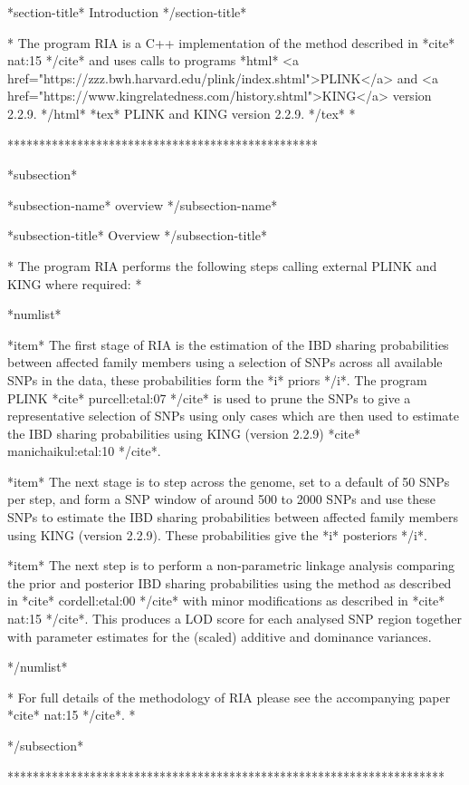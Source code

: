 *section-title* Introduction */section-title*

*
The program RIA is a C++ implementation of the method described in *cite* nat:15 */cite* and uses calls to programs *html* <a href="https://zzz.bwh.harvard.edu/plink/index.shtml">PLINK</a> and <a href="https://www.kingrelatedness.com/history.shtml">KING</a> version 2.2.9. */html* *tex* PLINK and KING version 2.2.9. */tex*
*

*************************************************


*subsection*

*subsection-name*
overview
*/subsection-name*

*subsection-title*
Overview
*/subsection-title*

*
The program RIA performs the following steps calling external PLINK and KING where required:
*

*numlist*

*item*
The first stage of RIA is the estimation of the IBD sharing probabilities between affected family members using a selection of SNPs across all available SNPs in the data, these probabilities form the *i* priors */i*. The program PLINK *cite* purcell:etal:07 */cite* is used to prune the SNPs to give a representative selection of SNPs using only cases which are then used to estimate the IBD sharing probabilities using KING (version 2.2.9) *cite* manichaikul:etal:10 */cite*.


*item*
The next stage is to step across the genome, set to a default of 50 SNPs per step, and form a SNP window of around 500 to 2000 SNPs and use these SNPs to estimate the IBD sharing probabilities between affected family members using KING (version 2.2.9). These probabilities give the *i* posteriors */i*.

*item*
The next step is to perform a non-parametric linkage analysis comparing the prior and posterior IBD sharing probabilities using the method as described in *cite* cordell:etal:00 */cite* with minor modifications as described in *cite* nat:15 */cite*. This produces a LOD score for each analysed SNP region together with parameter estimates for the (scaled) additive and dominance variances.

*/numlist*


*
For full details of the methodology of RIA please see the accompanying paper *cite* nat:15 */cite*.
*

*/subsection*



*********************************************************************

